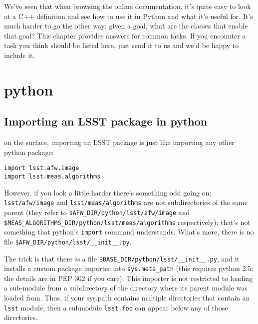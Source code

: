 
We've seen that when browsing the online documentation, it's quite
easy to look at a C++ definition and see how to use it in Python and
what it's useful for.  It's much harder to go the other way: given a
goal, what are the classes that enable that goal?  This chapter
provides answers for common tasks. If you encounter a task you think
should be listed here, just send it to us and we'd be happy to include
it.

\section{python}

\subsection{Importing an LSST package in python}

on the surface, importing an LSST package is just like importing any other python package:
\begin{verbatim}
import lsst.afw.image
import lsst.meas.algorithms
\end{verbatim}

However, if you look a little harder there's something odd going on; \verb|lsst/afw/image| and
\verb|lsst/meas/algorithms| are not subdirectories of the same parent (they refer to
\verb|$AFW_DIR/python/lsst/afw/image| and \hfil\break\verb|$MEAS_ALGORITHMS_DIR/python/lsst/meas/algorithms| respectively);
that's not something that python's \verb|import| command understands.  What's more, there is no file
\verb|$AFW_DIR/python/lsst/__init__.py|.

The trick is that there \textit{is} a file \verb|$BASE_DIR/python/lsst/__init__.py|, and it installs a custom
package importer into \verb|sys.meta_path| (this requires python 2.5; the details are in PEP 302 if you care).
This importer is not restricted to loading a sub-module from a subdirectory of the directory where its parent
module was loaded from.  Thus, if your sys.path contains multiple directories that contain an \verb|lsst|
module, then a submodule \verb|lsst.foo| can appear below any of those directories.

